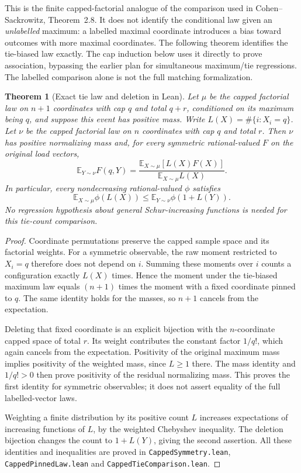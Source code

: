\documentclass[11pt]{article}
\newtheorem{theorem}{Theorem}
\begin{document}
This is the finite capped-factorial analogue of the comparison used in
Cohen--Sackrowitz, Theorem~2.8. It does not identify the conditional law
given an \emph{unlabelled} maximum: a labelled maximal coordinate
introduces a bias toward outcomes with more maximal coordinates.
The following theorem identifies the tie-biased law exactly. The cap
induction below uses it directly to prove association, bypassing the
earlier plan for simultaneous maximum/tie regressions. The labelled
comparison alone is not the full matching formalization.

\begin{theorem}[Exact tie law and deletion in Lean]\label{thm:leantielaw}
Let $\mu$ be the capped factorial law on $n+1$ coordinates with cap $q$
and total $q+r$, conditioned on its maximum being $q$, and suppose this
event has positive mass. Write $L(X)=\#\{i:X_i=q\}$. Let $\nu$ be the
capped factorial law on $n$ coordinates with cap $q$ and total $r$.
Then $\nu$ has positive normalizing mass and, for every symmetric
rational-valued $F$ on the original load vectors,
\[
 \mathbb E_{Y\sim\nu}F(q,Y)
 =\frac{\mathbb E_{X\sim\mu}[L(X)F(X)]}
        {\mathbb E_{X\sim\mu}L(X)}.
\]
In particular, every nondecreasing rational-valued $\phi$ satisfies
\[
 \mathbb E_{X\sim\mu}\phi(L(X))
 \leq \mathbb E_{Y\sim\nu}\phi(1+L(Y)).
\]
No regression hypothesis about general Schur-increasing functions is
needed for this tie-count comparison.
\end{theorem}
\begin{proof}
Coordinate permutations preserve the capped sample space and its
factorial weights. For a symmetric observable, the raw moment restricted
to $X_i=q$ therefore does not depend on $i$. Summing these moments over
$i$ counts a configuration exactly $L(X)$ times. Hence the moment under
the tie-biased maximum law equals $(n+1)$ times the moment with a fixed
coordinate pinned to $q$. The same identity holds for the masses, so
$n+1$ cancels from the expectation.

Deleting that fixed coordinate is an explicit bijection with the
$n$-coordinate capped space of total $r$. Its weight contributes the
constant factor $1/q!$, which again cancels from the expectation.
Positivity of the original maximum mass implies positivity of the
weighted mass, since $L\geq1$ there. The mass identity and $1/q!>0$
then prove positivity of the residual normalizing mass.
This proves the first identity for symmetric observables; it does not
assert equality of the full labelled-vector laws.

Weighting a finite distribution by its positive count $L$ increases
expectations of increasing functions of $L$, by the weighted Chebyshev
inequality. The deletion bijection changes the count to $1+L(Y)$, giving
the second assertion. All these identities and inequalities are proved
in \texttt{CappedSymmetry.lean}, \texttt{CappedPinnedLaw.lean} and
\texttt{CappedTieComparison.lean}.
\end{proof}
\end{document}
